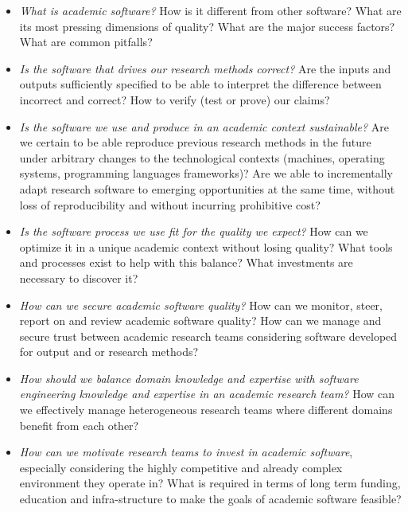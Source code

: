 \documentclass[a4paper,UKenglish]{dagman}
\begin{document}
\begin{itemize}
\item \emph{What is academic software?} How is it different from other software? What are its most pressing dimensions of quality? What are the major success factors? What are common pitfalls?
\item \emph{Is the software that drives our research methods correct?} Are the inputs and outputs sufficiently specified to be able to interpret the difference between incorrect and correct? How to verify (test or prove) our claims?
\item \emph{Is the software we use and produce in an academic context sustainable?}
Are we certain to be able reproduce previous research methods in the future under arbitrary changes to the technological contexts (machines, operating systems, programming languages frameworks)? Are we able to incrementally adapt research software to emerging opportunities at the same time, without loss of reproducibility and without incurring prohibitive cost?
\item \emph{Is the software process we use fit for the quality we expect?} How can we optimize it in a unique academic context without losing quality? What tools and processes exist to help with this balance? What investments are necessary to discover it?
\item \emph{How can we secure academic software quality?} How can we monitor, steer, report on and review academic software quality? How can we manage and secure trust between academic research teams considering software developed for output and or research methods?
\item \emph{How should we balance domain knowledge and expertise with software engineering knowledge and expertise in an academic research team?} How can we effectively manage heterogeneous research teams where different domains benefit from each other?   
\item \emph{How can we motivate research teams to invest in academic software}, especially considering the highly competitive and already complex environment they operate in?
What is required in terms of long term funding, education and infra-structure to make the goals of academic software feasible?
\end{itemize}
\end{document}
